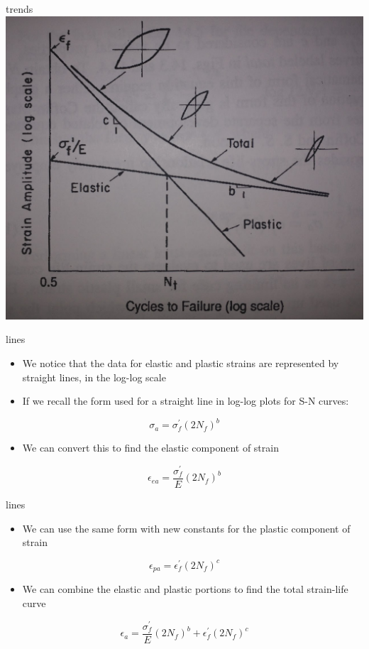 \documentclass[
  letterpaper,
  ignorenonframetext,
  aspectratio=43,
  handout,
  12pt]{beamer}
\providecommand{\tightlist}{%
  \setlength{\itemsep}{0pt}\setlength{\parskip}{0pt}}
\providecommand{\tightlist}{%
\setlength{\itemsep}{0pt}\setlength{\parskip}{0pt}}
\let\Oldincludegraphics\includegraphics
\renewcommand{\includegraphics}[2][]{\Oldincludegraphics[width=\textwidth,height=0.7\textheight,keepaspectratio]{#2}}
\begin{document}
\begin{frame}{trends}
\protect\hypertarget{trends}{}
\includegraphics{../images/elastic-plastic.jpg}
\end{frame}

\begin{frame}{lines}
\protect\hypertarget{lines}{}
\begin{itemize}
\tightlist
\item
  We notice that the data for elastic and plastic strains are
  represented by straight lines, in the log-log scale
\item
  If we recall the form used for a straight line in log-log plots for
  S-N curves:
\end{itemize}

\[ \sigma_a = \sigma_f^\prime (2 N_f)^b\]

\begin{itemize}
\tightlist
\item
  We can convert this to find the elastic component of strain
\end{itemize}

\[\epsilon_{ea} = \frac{\sigma_f^\prime}{E} (2N_f)^b\]
\end{frame}

\begin{frame}{lines}
\protect\hypertarget{lines-1}{}
\begin{itemize}
\tightlist
\item
  We can use the same form with new constants for the plastic component
  of strain
\end{itemize}

\[ \epsilon_{pa} = \epsilon_f^\prime (2 N_f)^c\]

\begin{itemize}
\tightlist
\item
  We can combine the elastic and plastic portions to find the total
  strain-life curve
\end{itemize}

\[\epsilon_a = \frac{\sigma_f^\prime}{E} (2N_f)^b + \epsilon_f^\prime (2 N_f)^c\]
\end{frame}
\end{document}
